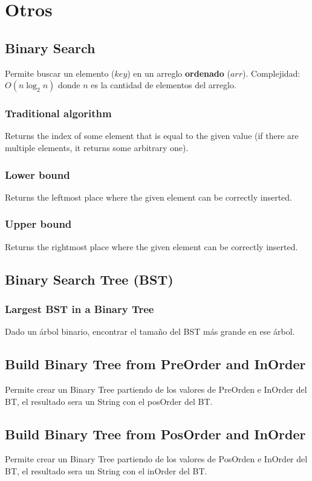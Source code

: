\documentclass[10pt,letterpaper,twocolumn]{article}
\newcommand{\source}[1]{
  
  \dotfill
}
\begin{document}
\section{Otros}
  \subsection{Binary Search}
    Permite buscar un elemento ($key$) en un arreglo \textbf{ordenado} ($arr$).
    Complejidad: $O(n \log_2 n)$ donde $n$ es la cantidad de elementos del arreglo.\\
    \source{./src/binarySearch.cpp}
    \subsubsection{Traditional algorithm}
      Returns the index of some element that is equal to the given value (if there are multiple
      elements, it returns some arbitrary one).
      \source{./src/binary_search.cpp}
    \subsubsection{Lower bound}
      Returns the leftmost place where the given element can be correctly inserted.
      \source{./src/lower_bound.cpp}
    \subsubsection{Upper bound}
      Returns the rightmost place where the given element can be correctly inserted.
      \source{./src/upper_bound.cpp}
  \subsection{Binary Search Tree (BST)}
    \subsubsection{Largest BST in a Binary Tree}
      Dado un árbol binario, encontrar el tamaño del BST más grande en ese árbol.
      \source{./src/largest_bst.java}
  \subsection{Build Binary Tree from PreOrder and InOrder}
    Permite crear un Binary Tree partiendo de los valores de PreOrden e InOrder del BT, el resultado sera un String con el posOrder del BT.
    \source{./src/build-BT-from-pre-in.cpp}
   \subsection{Build Binary Tree from PosOrder and InOrder}
    Permite crear un Binary Tree partiendo de los valores de PosOrden e InOrder del BT, el resultado sera un String con el inOrder del BT.
    \source{./src/build-BT-from-pos-in.cpp}
\end{document}
